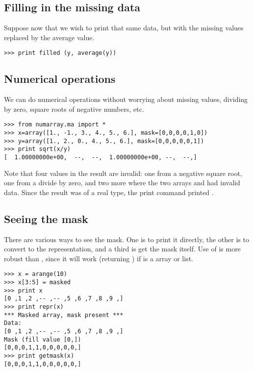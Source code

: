 \subsection{Filling in the missing data}
\label{sec:numarray.ma:filling-missing-data}

Suppose now that we wish to print that same data, but with the missing values
replaced by the average value.
\begin{verbatim}
>>> print filled (y, average(y))
\end{verbatim}


\subsection{Numerical operations}
\label{sec:numarray.ma:numerical-operations}

We can do numerical operations without worrying about missing values, dividing
by zero, square roots of negative numbers, etc.
\begin{verbatim}
>>> from numarray.ma import *
>>> x=array([1., -1., 3., 4., 5., 6.], mask=[0,0,0,0,1,0])
>>> y=array([1., 2., 0., 4., 5., 6.], mask=[0,0,0,0,0,1])
>>> print sqrt(x/y)
[  1.00000000e+00,  --,  --,  1.00000000e+00, --,  --,]
\end{verbatim}
Note that four values in the result are invalid: one from a negative square
root, one from a divide by zero, and two more where the two arrays  and
 had invalid data. Since the result was of a real type, the print
command printed .



\subsection{Seeing the mask}
\label{sec:numarray.ma:seeing-mask}

There are various ways to see the mask. One is to print it directly, the other
is to convert to the  representation, and a third is get the
mask itself.  Use of  is more robust than ,
since it will work (returning ) if  is a
\module{\numarray} array or list.
\begin{verbatim}
>>> x = arange(10)
>>> x[3:5] = masked
>>> print x
[0 ,1 ,2 ,-- ,-- ,5 ,6 ,7 ,8 ,9 ,]
>>> print repr(x)
*** Masked array, mask present ***
Data:
[0 ,1 ,2 ,-- ,-- ,5 ,6 ,7 ,8 ,9 ,]
Mask (fill value [0,])
[0,0,0,1,1,0,0,0,0,0,]
>>> print getmask(x)
[0,0,0,1,1,0,0,0,0,0,]
\end{verbatim}



